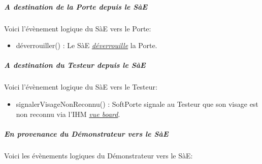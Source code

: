 \subparagraph{\textit{A destination de la Porte depuis le SàE}} 
\noindent Voici l'évènement logique du SàE vers le Porte:

    \begin{itemize}
        \item déverrouiller() : Le SàE \hyperlink{deverrouiller}{\textit{déverrouille}} la Porte. 
    \end{itemize}

\newpage

\subparagraph{\textit{A destination du Testeur depuis le SàE}} 
\noindent Voici l'évènement logique du SàE vers le Testeur:
    
        \begin{itemize}
            \item signalerVisageNonReconnu() : SoftPorte signale au Testeur que son visage est non reconnu via l'IHM \hyperlink{EcranSoftPorte}{\textit{vue board}}. 
        \end{itemize}

\subparagraph{\textit{En provenance du Démonstrateur vers le SàE}} 
\noindent Voici les évènements logiques du Démonstrateur vers le SàE:

